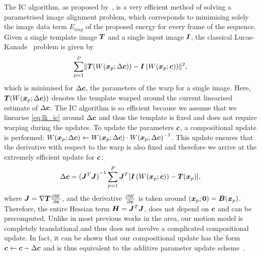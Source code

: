 The IC algorithm, as proposed by~\cite{baker2004lucas}, is a very efficient method of solving
a parametrised image alignment problem, which corresponds to minimising solely the image data 
term $E_{img}$ of the proposed energy for every frame of the sequence. Given a single 
template image $\boldsymbol{T}$ and a single input image $\boldsymbol{I}$, the classical 
Lucas-Kanade~\cite{lucas1981iterative} problem is given by
\begin{equation}\label{eq:lk_ic}
    \sum_{p=1}^P  \lVert{} 
                         \boldsymbol{T}(W(\boldsymbol{x}_p;\Delta \boldsymbol{c})) -
                         \boldsymbol{I}\left( W(\boldsymbol{x}_p;\boldsymbol{c}) \right)
                         \rVert^2,
\end{equation}
which is minimised for $\Delta \boldsymbol{c}$, the parameters of the warp for a single image. 
Here, $\boldsymbol{T}(W(\boldsymbol{x}_p;\Delta \boldsymbol{c}))$ denotes 
the template warped around the current linearised estimate of $\Delta \boldsymbol{c}$.
The IC algorithm is so efficient because we assume that we
linearise \cref{eq:lk_ic} around $\Delta \boldsymbol{c}$ and thus the template
is fixed and does not require warping during the updates. To update the parameters
$\boldsymbol{c}$, a compositional update is performed: 
$W(\boldsymbol{x}_p;\Delta \boldsymbol{c}) \leftarrow W(\boldsymbol{x}_p;\Delta \boldsymbol{c}) \cdot {W(\boldsymbol{x}_p;\Delta \boldsymbol{c})}^{-1}$.
This update ensures that the derivative with respect to the warp is also fixed
and therefore we arrive at the extremely efficient update for $\boldsymbol{c}$:
\begin{equation}\label{eq:lk_ic_update}
    \Delta \boldsymbol{c} = {(\boldsymbol{J}^T \boldsymbol{J})}^{-1} \sum_{p=1}^P \boldsymbol{J}^T [\boldsymbol{I}\left( W(\boldsymbol{x}_p;\boldsymbol{c}) \right) - \boldsymbol{T}(\boldsymbol{x}_p)],
\end{equation}
where $\boldsymbol{J} = \nabla \boldsymbol{T} \frac{\partial W}{\partial \boldsymbol{c}}$,
and the derivative $\frac{\partial W}{\partial \boldsymbol{c}}$ is 
taken around $(\boldsymbol{x}_p;\boldsymbol{0}) = \boldsymbol{B}(\boldsymbol{x}_p)$. Therefore,
the entire Hessian term $\boldsymbol{H} = \boldsymbol{J}^T \boldsymbol{J}$, does not depend
on $\boldsymbol{c}$ and can be precomputed.
Unlike in most previous works in the area, our motion model is completely 
translational and thus does not involve a complicated compositional update. 
In fact, it can be shown that our compositional update
has the form $\boldsymbol{c} \leftarrow \boldsymbol{c} - \Delta \boldsymbol{c}$ and is thus equivalent to the 
additive parameter update scheme~\cite{amberg2009compositional}.

